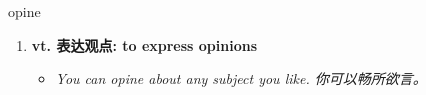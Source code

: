 
\begin{frame}
{\huge opine}
\begin{center}
\begin{enumerate}\Large
  \item \textbf{vt. 表达观点: to express opinions}
  \begin{itemize}
    \item \em{\Large{You can opine about any subject you like. 你可以畅所欲言。}}
  \end{itemize}
\end{enumerate}
\end{center}
\end{frame}
